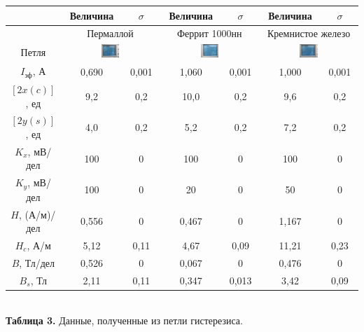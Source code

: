 \documentclass[a4paper, 12pt]{article}%
\begin{document}
\begin{center}
\begin{tabular}{|c|c|c|c|c|c|c|}
\hline
 & Величина & $\sigma$ & Величина & $\sigma$ & Величина & $\sigma$ \\ \hline
 & \multicolumn{2}{c|}{Пермаллой} & \multicolumn{2}{c|}{Феррит 1000нн} & \multicolumn{2}{c|}{Кремнистое железо} \\ \hline
Петля & \multicolumn{2}{c|}{\includegraphics[width = 0.2\textwidth]{Пермаллой.jpg}} &  \multicolumn{2}{c|}{\includegraphics[width = 0.2\textwidth]{Феррит.jpg}} &  \multicolumn{2}{c|}{\includegraphics[width = 0.2\textwidth]{Кремнистое_железо.jpg}} \\ \hline
$I_{\text{эф}}$, А & 0,690 & 0,001 & 1,060 & 0,001 & 1,000 & 0,001 \\ \hline
$[2x(c)]$, ед & 9,2 & 0,2 & 10,0 & 0,2 & 9,6 & 0,2 \\ \hline
$[2y(s)]$, ед & 4,0 & 0,2 & 5,2 & 0,2 & 7,2 & 0,2 \\ \hline
$K_x$, мВ/дел & 100 & 0 & 100 & 0 & 100 & 0 \\ \hline
$K_y$, мВ/дел & 100 & 0 & 20 & 0 & 50 & 0 \\ \hline
$H$, (А/м)/дел & 0,556 & 0 & 0,467 & 0 & 1,167 & 0 \\ \hline
$H_c$, А/м & 5,12 & 0,11 & 4,67 & 0,09 & 11,21 & 0,23 \\ \hline
$B$, Тл/дел & 0,526 & 0 & 0,067 & 0 & 0,476 & 0 \\ \hline
$B_s$, Тл & 2,11 & 0,11 & 0,347 & 0,013 & 3,42 & 0,09 \\ \hline
\end{tabular}\\

\textbf{Таблица 3.} Данные, полученные из петли гистерезиса.
\end{center}
\end{document}
